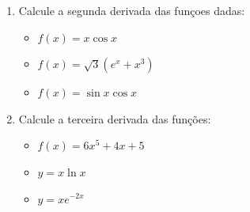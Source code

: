\documentclass[12pt]{article}
\begin{document}
\begin{enumerate}
			\item Calcule a segunda derivada das funçoes dadas:
			
			\begin{itemize}
				\item [a)] $f(x)=x\cos x$
				\item [b)] $f(x)=\sqrt{3}(e^{x}+x^{3})$
				\item [c)] $f(x)=\sin x \cos x$
			\end{itemize}
			
			\item Calcule a terceira derivada das funções:
			\begin{itemize}
				\item [a)] $f(x)=6x^{5}+4x+5$
				\item [b)] $y=x \ln x$
				\item [c)] $y=xe^{-2x}$
				
			\end{itemize}
			
		\end{enumerate}
	
\end{document}
